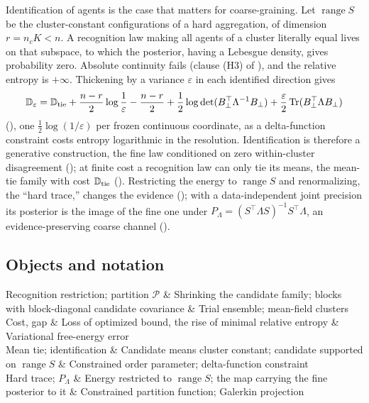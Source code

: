 Identification of agents is the case that matters for coarse-graining. Let \(\operatorname{range}S\) be
the cluster-constant configurations of a hard aggregation, of dimension \(r=n_cK<n\). A recognition law
making all agents of a cluster literally equal lives on that subspace, to which the posterior, having a
Lebesgue density, gives probability zero. Absolute continuity fails (clause (H3) of
), and the relative entropy is \(+\infty\). Thickening by a variance
\(\varepsilon\) in each identified direction gives
\[
\mathbb D_\varepsilon=\mathbb D_{\rm tie}+\frac{n-r}2\log\frac1\varepsilon-\frac{n-r}2
+\frac12\log\det(B_\perp^\top\Lambda^{-1}B_\perp)+\frac\varepsilon2\operatorname{Tr}(B_\perp^\top\Lambda B_\perp)
\]
(), one \(\tfrac12\log(1/\varepsilon)\) per frozen continuous
coordinate, as a delta-function constraint costs entropy logarithmic in the resolution. Identification is
therefore a generative construction, the fine law conditioned on zero within-cluster disagreement
(); at finite cost a recognition law can only tie its means, the
mean-tie family with cost \(\mathbb D_{\rm tie}\) (). Restricting the energy to
\(\operatorname{range}S\) and renormalizing, the ``hard trace,'' changes the evidence
(); with a data-independent joint precision its posterior is the
image of the fine one under \(P_\Lambda=(S^\top\Lambda S)^{-1}S^\top\Lambda\), an evidence-preserving
coarse channel ().

\subsection{Objects and notation}

\begin{decoder}
Recognition restriction; partition \(\mathcal P\) & Shrinking the candidate family; blocks with block-diagonal candidate covariance & Trial ensemble; mean-field clusters\\
Cost, gap & Loss of optimized bound, the rise of minimal relative entropy & Variational free-energy error\\
Mean tie; identification & Candidate means cluster constant; candidate supported on \(\operatorname{range}S\) & Constrained order parameter; delta-function constraint\\
Hard trace; \(P_\Lambda\) & Energy restricted to \(\operatorname{range}S\); the map carrying the fine posterior to it & Constrained partition function; Galerkin projection\\
\end{decoder}

